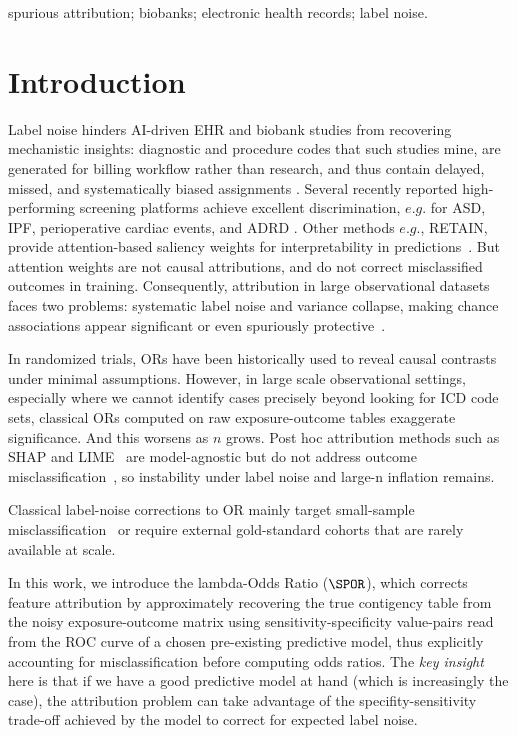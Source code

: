 \documentclass[lineno]{biometrika}
\begin{document}
\begin{keywords}
spurious attribution; biobanks; electronic health records; label noise.
\end{keywords}


\section{Introduction} 
Label noise hinders AI-driven EHR and biobank studies from recovering mechanistic insights: diagnostic and procedure codes that such studies  mine, are generated for billing workflow rather than research, and thus contain delayed, missed, and systematically biased assignments \citep{halpern2016electronic}.  Several recently reported  high-performing screening platforms  achieve excellent discrimination, $e.g.$ \zcor for ASD, IPF, perioperative cardiac events, and ADRD \citep{ASDzed,IPFzed,JAHAzed,ADRDzed}. Other methods $e.g.$, RETAIN, provide attention-based saliency weights for interpretability in predictions~\citep{choi2016retain}. But attention weights are not causal attributions, and do not correct misclassified outcomes in training. Consequently, attribution in large observational datasets faces two problems: systematic label noise and variance collapse, making chance associations appear significant or even spuriously protective~\citep{greenland1988sensitivity}.


In randomized trials, ORs have been historically used to  reveal causal contrasts under minimal assumptions. However, in large scale observational settings, especially where we cannot identify cases precisely beyond looking for ICD code sets,  classical ORs computed on raw exposure-outcome tables exaggerate significance. And this worsens as $n$ grows. Post hoc attribution methods such as SHAP and LIME~\citep{lundberg17shap} are model-agnostic but do not address outcome misclassification~\citep{slack2020fooling}, so instability under label noise and large-n inflation remains.

Classical label-noise corrections to OR mainly target small-sample misclassification~\citep{greenland1988sensitivity} or require external gold-standard cohorts that are rarely available at scale.

In this work, we introduce the lambda-Odds Ratio ($\SPOR$), which corrects feature  attribution by approximately recovering the true contigency table from   the noisy exposure-outcome matrix using sensitivity-specificity value-pairs read  from the ROC curve of a chosen pre-existing  predictive model, thus  explicitly accounting for misclassification before computing odds ratios. The \textit{key insight} here is that if we have a good predictive model at hand (which is increasingly the case), the attribution problem can take advantage of the specifity-sensitivity trade-off achieved by the model to correct for expected  label noise.
\end{document}
